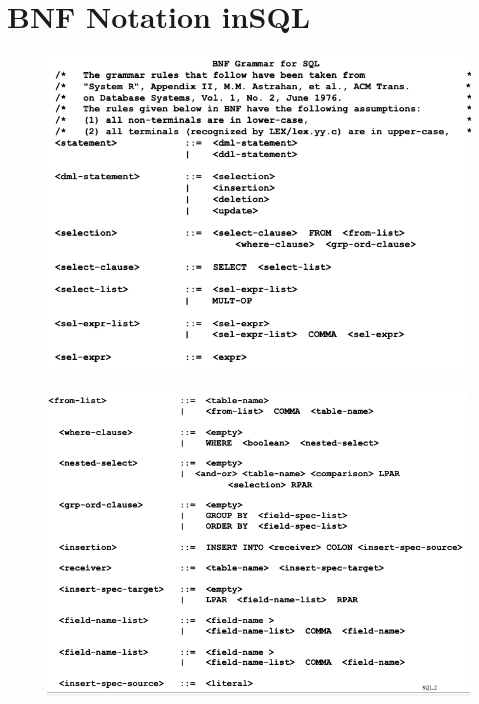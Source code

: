 \documentclass[
	12pt, %
]{fphw}
\begin{document}

\section*{{\color{RoyalPurple}BNF Notation inSQL}}

\begin{figure}[H]
  \centering
  \includegraphics[scale=0.7]{images/bnf1.png}
\end{figure}
\begin{figure}[H]
  \centering
  \includegraphics[scale=0.7]{images/bnf2.png}
\end{figure}
\end{document}
